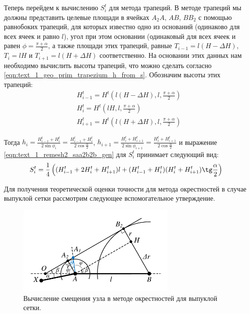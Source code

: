 Теперь перейдем к вычислению $S_i^t$ для метода трапеций.
В методе трапеций мы должны представить целевые площади в ячейках $A_2A$, $AB$, $BB_2$ с помощью равнобоких трапеций, для которых известно одно из оснований (одинаково для всех ячеек и равно $l$), угол при этом основании (одинаковый для всех ячеек и равен $\phi = \frac{\pi + \alpha}{2}$, а также площади этих трапеций, равные $T_{i - 1} = l(H - \Delta H)$, $T_i = lH$ и $T_{i + 1} = l(H + \Delta H)$ соответственно.
На основании этих данных нам необходимо вычислить высоты трапеций, что можно сделать согласно \eqref{eqn:text_1_geo_prim_trapezium_h_from_s}.
Обозначим высоты этих трапеций:
\begin{equation}
	\begin{aligned}\label{eqn:text_1_remesh_2_Ht_vypukl}
		& H_{i - 1}^t = H^t\left(l(H - \Delta H), l, \frac{\pi + \alpha}{2}\right) \\ 
		& H_i^t = H^t\left(lH, l, \frac{\pi + \alpha}{2}\right) \\
		& H_{i + 1}^t = H^t\left(l(H + \Delta H), l, \frac{\pi + \alpha}{2}\right)
	\end{aligned}
\end{equation}

Тогда $h_i = \frac{H_{i - 1}^t + H_i^t}{2 \sin \phi_i} = \frac{H_{i - 1}^t + H_i^t}{2 \cos \frac{\alpha}{2}}$, $h_{i+1} = \frac{H_i^t + H_{i+1}^t}{2 \sin \phi_{i + 1}} = \frac{H_i^t + H_{i+1}^t}{2 \cos \frac{\alpha}{2}}$ и выражение \eqref{eqn:text_1_remesh2_saa2b2b_gen} для $S_i^t$ принимает следующий вид:
\begin{equation}\label{eqn:text_1_remesh2_trap}
	S_i^t = \frac{1}{4} \left( (H_{i - 1}^t + 2 H_i^t + H_{i + 1}^t)l + (H_{i - 1}^t + H_i^t) (H_i^t + H_{i+1}^t) \tg \frac{\alpha}{2} \right)
\end{equation}

Для получения теоретической оценки точности для метода окрестностей в случае выпуклой сетки рассмотрим следующее вспомогательное утверждение.

\begin{figure}[ht]
\centering
\includegraphics[width=0.7\textwidth]{pics/text_1_remesh_2d/accuracy_okrestnost.pdf}
\singlespacing
{}\caption{Вычисление смещения узла в методе окрестностей для выпуклой сетки.}
\label{fig:text_1_remesh_2d_accuracy_okrestnost}
\end{figure}

